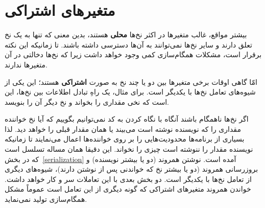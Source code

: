 \documentclass{book}
\begin{document}
\section {متغیرهای اشتراکی}
\label{shared}

    بیشتر مواقع، غالب متغیرها در اکثر نخ‌ها \textbf{محلی} هستند، بدین معنی که تنها به یک نخ تعلق دارند و 
    سایر نخ‌ها نمی‌توانند به آن‌ها دسترسی داشته باشند. تا زمانیکه این نکته برقرار است، مشکلات همگام‌سازی کمی وجود خواهد داشت زیرا که 
    نخ‌ها دخالتی در آن متغیرها ندارند. 

    امّا گاهی اوقات برخی متغیرها بین دو یا چند نخ به صورت \textbf{اشتراکی} هستند؛ این 
    یکی از شیوه‌های تعامل نخ‌ها با یکدیگر است. برای مثال، یک راهِ  تبادل اطلاعات بین نخ‌ها، این است که نخی مقداری را بخواند و نخ دیگر آن را بنویسد. 
    
    اگر نخ‌ها ناهمگام باشند آنگاه با نگاه کردن به کد نمی‌توانیم بگوییم که آیا نخ خواننده مقداری را که نویسنده نوشته است می‌بیند یا همان مقدار قبلی را خواهد دید. 
    لذا بسیاری از برنامه‌ها محدودیت‌هایی را بر روی خواننده‌ها اعمال می‌نمایند تا زمانیکه نویسنده مقدار را ننوشته است چیزی را نخواند. 
    این دقیقا همان مساله تسلسل است که در بخش~\ref{serialization} آمده است. 
    نوشتن همروند (دو یا بیشتر نویسنده) و بروزرسانی همروند (دو یا بیشتر نخ که خواندنی پس از نوشتن دارند)، شیوه‌های دیگری از تعامل 
    نخ‌ها با یکدیگر است. دو بخش بعدی با این تعاملات سر و کار خواهد داشت. خواندن همروند متغیرهای اشتراکی که گونه دیگری از این تعامل است 
    عموماً مشکل همگام‌سازی تولید نمی‌نماید. 
\end{document}
